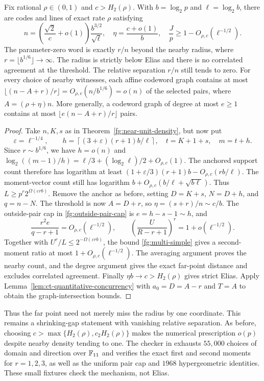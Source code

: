 \begin{corollary}
\label{fg:growing-far}
Fix rational $\rho\in(0,1)$ and $c>H_2(\rho)$. With
$b=\log_2p$ and $\ell=\log_2b$, there are codes and lines of exact
rate $\rho$ satisfying
\[
 n=\left(\frac{\sqrt2}{c}+o(1)\right)\frac{b^{3/2}}{\sqrt\ell},
 \quad \eta=\frac{c+o(1)}b,\quad
 \frac Jp\ge1-O_{\rho,c}(\ell^{-1/2}).
\]
The parameter-zero word is exactly $r/n$ beyond the nearby radius,
where $r=\lfloor b^{1/6}\rfloor\to\infty$.
The radius is strictly below Elias and there is no correlated agreement
at the threshold. The relative separation $r/n$ still tends to zero.
For every choice of nearby witnesses, each affine codeword graph
contains at most
$\lfloor(n-A+r)/r\rfloor=O_{\rho,c}(n/b^{1/6})=o(n)$
of the selected pairs, where $A=(\rho+\eta)n$.
More generally, a codeword graph of degree at most $e\ge1$ contains
at most $\lfloor e(n-A+r)/r\rfloor$ pairs.
\end{corollary}
\begin{proof}
Take $n,K,s$ as in Theorem~\ref{fg:near-unit-density}, but now put
\[
 \varepsilon=\ell^{-1/4},\qquad
 h=\left\lceil(3+\varepsilon)(r+1)b/\ell\right\rceil,
 \quad t=K+1+s,\quad m=t+h.
\]
Since $r\sim b^{1/6}$, we have $h=o(n)$ and
$\log_2((m-1)/h)=\ell/3+(\log_2\ell)/2+O_{\rho,c}(1)$.
The anchored support count therefore has logarithm at least
$(1+\varepsilon/3)(r+1)b-O_{\rho,c}(rb/\ell)$.
The moment-vector count still has logarithm
$b+O_{\rho,c}(b/\ell+\sqrt{b\ell})$. Thus
$L\ge p^r2^{\Omega(\varepsilon rb)}$.
Remove the anchor as before, setting $D=K+s$, $N=D+h$, and $q=n-N$.
The threshold is now $A=D+r$, so $\eta=(s+r)/n\sim c/b$.
The outside-pair cap in \eqref{fg:outside-pair-cap} is
$e=h-s-1\sim h$, and
\[
 \frac{r^2e}{q-r+1}=O_{\rho,c}(\ell^{-1/2}),\qquad
 \left(\frac{U}{R-r+1}\right)^r=1+o(\ell^{-1/2}).
\]
Together with $U^r/L\le2^{-\Omega(\varepsilon rb)}$, the bound
\eqref{fg:multi-simple} gives a second-moment ratio at most
$1+O_{\rho,c}(\ell^{-1/2})$. The averaging argument proves the
nearby count, and the degree argument gives the exact far-point
distance and excludes correlated agreement.
Finally $\eta b\to c>H_2(\rho)$ gives strict Elias.
Apply Lemma~\ref{lem:ct-quantitative-concurrency} with $a_0=D=A-r$
and $T=A$ to obtain the graph-intersection bounds.
\end{proof}

Thus the far point need not merely miss the radius by one coordinate.
This remains a shrinking-gap statement with vanishing relative
separation. As before, choosing
$c>\max\{H_2(\rho),c_2H_2(\rho)\}$ makes the numerical prescription
$o(p)$ despite nearby density tending to one.
The checker  in
 exhausts $55{,}000$ choices of domain
and direction over $\mathbb F_{11}$ and verifies the exact first and second
moments for $r=1,2,3$, as well as the uniform pair cap and $1968$
hypergeometric identities. These small fixtures check the mechanism, not Elias.


